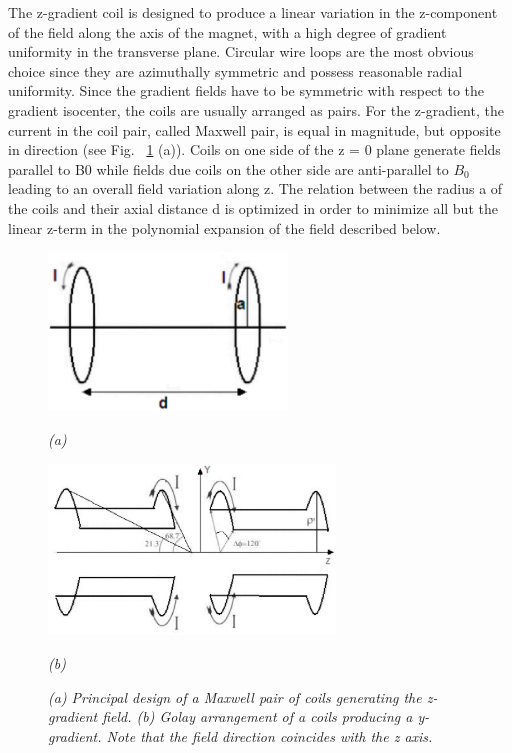 The z-gradient coil is designed to produce a linear variation in the z-component of the field along the
axis of the magnet, with a high degree of gradient uniformity in the transverse plane. Circular wire 
loops are the most obvious choice since they are azimuthally symmetric and possess reasonable radial 
uniformity. Since the gradient fields have to be symmetric with respect to the gradient isocenter, the 
coils are usually arranged as pairs. For the z-gradient, the current in the coil pair, called Maxwell 
pair, is equal in magnitude, but opposite in direction (see Fig. ~\ref{fig:coil_axis} (a)). 
Coils on one side of the z = 0 
plane generate fields parallel to B0 while fields due coils on the other side are anti-parallel to 
$B_0$ 
leading to an overall field variation along z. The relation between the radius a of the coils and their
axial distance d is optimized in order to minimize all but the linear z-term in the polynomial 
expansion of the field described below.
 
\begin{figure}[htb]
  \begin{minipage}[b]{2.5in}
    \centering
    \centerline{\mbox{\includegraphics[width=2.5in]{background/images/coil_z.eps}}}
    \centerline{\mbox{\emph{(a)}}}
  \end{minipage}
  \begin{minipage}[b]{3in}
    \centering
    \centerline{\mbox{\includegraphics[width=3in]{background/images/coil_y.eps}}}
    \centerline{\mbox{\emph{(b)}}}
  \end{minipage}
\caption{\emph{(a) Principal design of a Maxwell pair of coils generating the z-gradient field. (b) Golay arrangement of a coils producing a y-gradient. Note that the field direction coincides with the z axis.}} \label{fig:coil_axis}
\end{figure}

